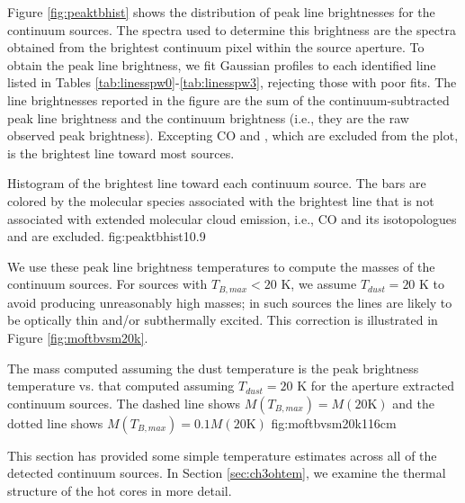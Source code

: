 \documentclass[twocolumn]{aastex61}
\begin{document}
Figure \ref{fig:peaktbhist} shows the distribution of peak line brightnesses
for the continuum sources.  The spectra used to determine this brightness are
the spectra obtained from the brightest continuum pixel within the source
aperture.  To obtain the peak line brightness, we fit Gaussian profiles to each
identified line listed in Tables \ref{tab:linesspw0}-\ref{tab:linesspw3},
rejecting those with poor fits.  The line brightnesses reported in the figure
are the sum of the continuum-subtracted peak line brightness and the continuum
brightness (i.e., they are the raw observed peak brightness).  Excepting CO and
\formaldehyde, which are excluded from the plot, \methanol is the brightest
line toward most sources. 

{Histogram of the brightest line toward each continuum source.
The bars are colored by the molecular species associated with the brightest
line that is not associated with extended molecular cloud emission,
i.e., CO and its isotopologues and \formaldehyde are excluded.}
{fig:peaktbhist}{1}{0.9\textwidth}

We use these peak line brightness temperatures to compute the masses of the
continuum sources.  For sources with $T_{B,max} < 20$ K, we assume $T_{dust} =
20$ K to avoid producing unreasonably high masses; in such sources the lines
are likely to be optically thin and/or subthermally excited.  This correction is
illustrated in Figure \ref{fig:moftbvsm20k}.

{The mass computed assuming the dust temperature is the peak brightness
temperature vs. that computed assuming $T_{dust}=20$ K  for the aperture extracted
continuum sources.
The dashed line shows $M(T_{B,max}) =
M(20\textrm{K})$ and the dotted line shows $M(T_{B,max}) = 0.1 
M(20\textrm{K})$ 
}{fig:moftbvsm20k}{1}{16cm}

This section has provided some simple temperature estimates across all of the
detected continuum sources.  In Section \ref{sec:ch3ohtem}, we  examine
the thermal structure of the hot cores in more detail.

\end{document}
